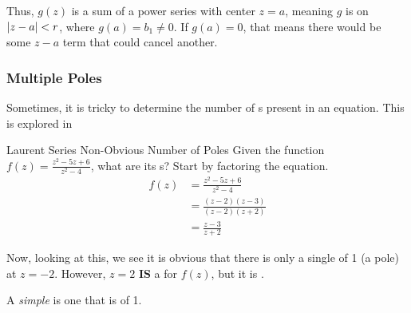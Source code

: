 Thus, $g(z)$ is a sum of a power series with center $z=a$, meaning $g$ is  on $\left\lvert z-a \right\rvert < r$, where $g(a) = b_{1} \neq 0$.
If $g(a) = 0$, that means there would be some $z-a$ term that could cancel another.

\subsubsection{Multiple Poles}\label{subsubsec:Multiple_Poles}
Sometimes, it is tricky to determine the number of s present in an equation.
This is explored in 
\begin{example}{Laurent Series Non-Obvious Number of Poles}
  Given the function $f(z) = \frac{z^{2} - 5z + 6}{z^{2} - 4}$, what are its s?
  \tcblower{}
  Start by factoring the equation.
  \begin{align*}
    f(z) &= \frac{z^{2} - 5z + 6}{z^{2}- 4} \\
         &= \frac{(z-2) (z-3)}{(z-2) (z+2)} \\
         &= \frac{z-3}{z+2}
  \end{align*}

  Now, looking at this, we see it is obvious that there is only a single  of  1 (a  pole) at $z=-2$.
  However, $z=2$ \textbf{IS} a  for $f(z)$, but it is .
\end{example}

\begin{definition}[Simple]\label{def:Simple_Pole}
  A \emph{simple}  is one that is of  1.
\end{definition}


